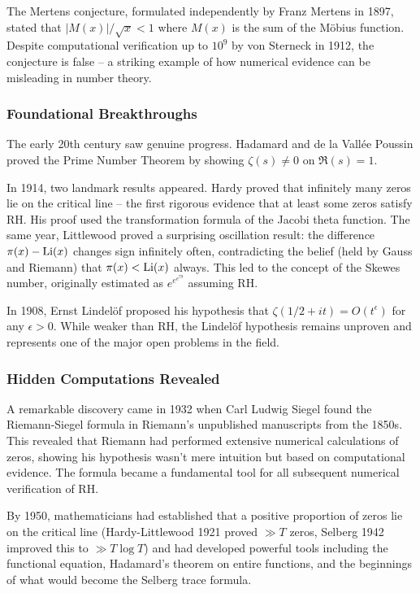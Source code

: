 The Mertens conjecture, formulated independently by Franz Mertens in 1897, stated that $|M(x)|/\sqrt{x} < 1$ where $M(x)$ is the sum of the M\"obius function. Despite computational verification up to $10^9$ by von Sterneck in 1912, the conjecture is false -- a striking example of how numerical evidence can be misleading in number theory.

\subsubsection*{Foundational Breakthroughs}

The early 20th century saw genuine progress. Hadamard and de la Vall\'ee Poussin proved the Prime Number Theorem by showing $\zeta(s) \neq 0$ on $\Re(s) = 1$. 

In 1914, two landmark results appeared. Hardy proved that infinitely many zeros lie on the critical line -- the first rigorous evidence that at least some zeros satisfy RH. His proof used the transformation formula of the Jacobi theta function. The same year, Littlewood proved a surprising oscillation result: the difference $\pi(x) - \operatorname{Li}(x)$ changes sign infinitely often, contradicting the belief (held by Gauss and Riemann) that $\pi(x) < \operatorname{Li}(x)$ always. This led to the concept of the Skewes number, originally estimated as $e^{e^{e^{79}}}$ assuming RH.

In 1908, Ernst Lindel\"of proposed his hypothesis that $\zeta(1/2 + it) = O(t^\epsilon)$ for any $\epsilon > 0$. While weaker than RH, the Lindel\"of hypothesis remains unproven and represents one of the major open problems in the field.

\subsubsection*{Hidden Computations Revealed}

A remarkable discovery came in 1932 when Carl Ludwig Siegel found the Riemann-Siegel formula in Riemann's unpublished manuscripts from the 1850s. This revealed that Riemann had performed extensive numerical calculations of zeros, showing his hypothesis wasn't mere intuition but based on computational evidence. The formula became a fundamental tool for all subsequent numerical verification of RH.

By 1950, mathematicians had established that a positive proportion of zeros lie on the critical line (Hardy-Littlewood 1921 proved $\gg T$ zeros, Selberg 1942 improved this to $\gg T \log T$) and had developed powerful tools including the functional equation, Hadamard's theorem on entire functions, and the beginnings of what would become the Selberg trace formula.

